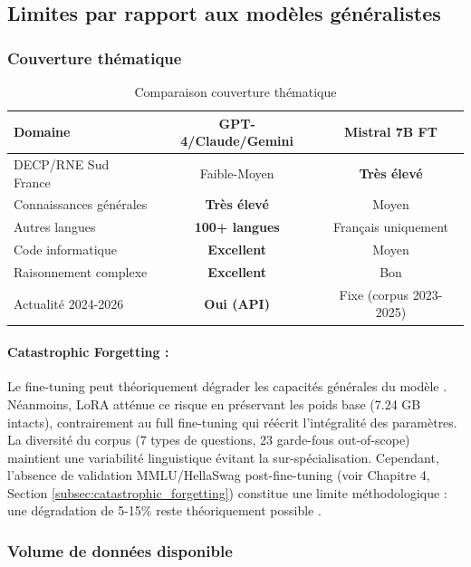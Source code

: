 \subsection{Limites par rapport aux modèles généralistes}

\subsubsection{Couverture thématique}

\begin{table}[h]
\centering
\caption{Comparaison couverture thématique}
\label{tab:coverage_comparison}
\begin{tabular}{@{}lcc@{}}
\toprule
\textbf{Domaine} & \textbf{GPT-4/Claude/Gemini} & \textbf{Mistral 7B FT} \\ \midrule
DECP/RNE Sud France & Faible-Moyen & \textbf{Très élevé} \\
Connaissances générales & \textbf{Très élevé} & Moyen \\
Autres langues & \textbf{100+ langues} & Français uniquement \\
Code informatique & \textbf{Excellent} & Moyen \\
Raisonnement complexe & \textbf{Excellent} & Bon \\
Actualité 2024-2026 & \textbf{Oui (API)} & Fixe (corpus 2023-2025) \\
\bottomrule
\end{tabular}
\end{table}

\paragraph{Catastrophic Forgetting :}
Le fine-tuning peut théoriquement dégrader les capacités générales du modèle \cite{kirkpatrick2017overcoming}. Néanmoins, LoRA atténue ce risque en préservant les poids base (7.24 GB intacts), contrairement au full fine-tuning qui réécrit l'intégralité des paramètres. La diversité du corpus (7 types de questions, 23 garde-fous out-of-scope) maintient une variabilité linguistique évitant la sur-spécialisation. Cependant, l'absence de validation MMLU/HellaSwag post-fine-tuning (voir Chapitre 4, Section \ref{subsec:catastrophic_forgetting}) constitue une limite méthodologique : une dégradation de 5-15\% reste théoriquement possible \cite{dettmers2023qlora}.

\subsubsection{Volume de données disponible}

